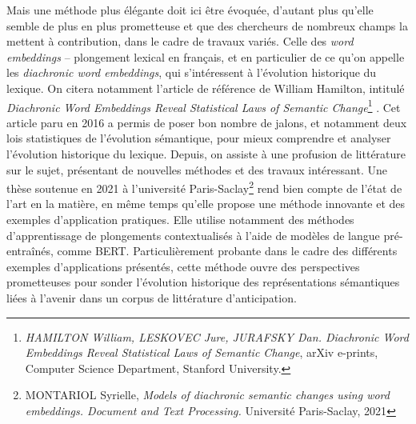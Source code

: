 \documentclass[letterpaper,portrait,12pt]{article}
\begin{document}
	Mais une m\'{e}thode plus \'{e}l\'{e}gante doit ici \^{e}tre \'{e}voqu\'{e}e, d'autant plus qu'elle semble de plus en plus prometteuse et que des chercheurs de nombreux champs la mettent \`{a} contribution, dans le cadre de travaux vari\'{e}s. Celle des \emph{word embeddings} -- plongement lexical en fran\c{c}ais, et en particulier de ce qu'on appelle les \emph{diachronic word embeddings}, qui s'int\'{e}ressent \`{a} l'\'{e}volution historique du lexique. On citera notamment l'article de r\'{e}f\'{e}rence de William Hamilton, intitul\'{e} \emph{Diachronic Word Embeddings Reveal Statistical Laws of Semantic Change}\footnote{\emph{\newpage
}\emph{	}\emph{{\scriptsize  HAMILTON William, LESKOVEC Jure, JURAFSKY Dan. Diachronic Word Embeddings Reveal Statistical Laws of Semantic Change}}{\scriptsize , arXiv e-prints, Computer Science Department, Stanford University.}} . Cet article paru en 2016 a permis de poser bon nombre de jalons, et notamment deux lois statistiques de l'\'{e}volution s\'{e}mantique, pour mieux comprendre et analyser l'\'{e}volution historique du lexique. Depuis, on assiste \`{a} une profusion de litt\'{e}rature sur le sujet, pr\'{e}sentant de nouvelles m\'{e}thodes et des travaux int\'{e}ressant. Une th\`{e}se soutenue en 2021 \`{a} l'universit\'{e} Paris-Saclay\footnote{	 MONTARIOL Syrielle, \emph{Models of diachronic semantic changes using word embeddings. Document and Text Processing.} Universit\'{e} Paris-Saclay, 2021}  rend bien compte de l'\'{e}tat de l'art en la mati\`{e}re, en m\^{e}me temps qu'elle propose une m\'{e}thode innovante et des exemples d'application pratiques. Elle utilise notamment des m\'{e}thodes d'apprentissage de plongements contextualis\'{e}s \`{a} l'aide de mod\`{e}les de langue pr\'{e}-entra\^{i}n\'{e}s, comme BERT. Particuli\`{e}rement probante dans le cadre des diff\'{e}rents exemples d'applications pr\'{e}sent\'{e}s, cette m\'{e}thode ouvre des perspectives prometteuses pour sonder l'\'{e}volution historique des repr\'{e}sentations s\'{e}mantiques li\'{e}es \`{a} l'avenir dans un corpus de litt\'{e}rature d'anticipation.
\end{document}
